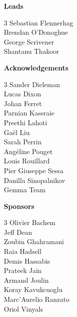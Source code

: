 \noindent\textbf{Leads}

\begin{multicols}{3}
\noindent
Sebastian Flennerhag \\ 
Brendan O'Donoghue \\ 
George Scrivener \\ 
Shantanu Thakoor
\end{multicols}

\noindent\textbf{Acknowledgements}

\begin{multicols}{3}
\noindent
Sander Dieleman \\
Lucas Dixon \\
Johan Ferret \\
Parnian Kassraie \\
Preethi Lahoti \\
Gaël Liu \\
Sarah Perrin \\
Angéline Pouget \\
Louis Rouillard \\
Pier Giuseppe Sessa \\
Danilla Sinopalnikov \\
Gemma Team \\
\end{multicols}

\noindent\textbf{Sponsors}

\begin{multicols}{3}
\noindent
Olivier Bachem \\ 
Jeff Dean \\ 
Zoubin Ghahramani \\ 
Raia Hadsell \\ 
Demis Hassabis \\ 
Prateek Jain \\ 
Armand Joulin \\ 
Koray Kavukcuoglu \\ 
Marc’Aurelio Ranzato \\ 
Oriol Vinyals
\end{multicols}
